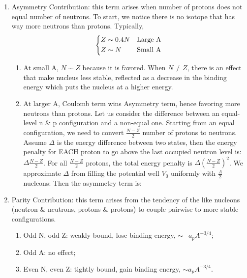 \documentclass{school-22.101-notes}
\begin{document}
\begin{enumerate}
    \item Asymmetry Contribution: this term arises when number of protons does not equal number of neutrons. To start, we notice there is no isotope that has way more neutrons than protons. Typically, 
    \begin{align}
    \begin{dcases*}
    Z \sim 0.4 N & Large A \\
    Z \sim N & Small A
    \end{dcases*}
    \end{align}
    \begin{enumerate}
    \item At small A, $N \sim Z$ because it is favored. When $N \neq Z$, there is an effect that make nucleus less stable, reflected as a decrease in the binding energy which puts the nucleus at a higher energy. 
    \item At larger A, Coulomb term wins Asymmetry term, hence favoring more neutrons than protons. Let us consider the difference between an equal-level n \& p configuration and a non-equal one. Starting from an equal configuration, we need to convert $\frac{N-Z}{2}$ number of protons to neutrons. Assume $\Delta$ is the energy difference between two states, then the energy penalty for EACH proton to go above the last occupied neutron level is: $\Delta \frac{N-Z}{2}$. For all $\frac{N-Z}{2}$ protons, the total energy penalty is $\Delta \left( \frac{N-Z}{2} \right)^2$. We approximate $\Delta$ from filling the potential well $V_0$ uniformly with $\frac{A}{2}$ nucleons: 
    Then the asymmetry term is:
    \end{enumerate}

    \item Parity Contribution: this term arises from the tendency of the like nucleons (neutron \& neutrons, protons \& protons) to couple pairwise to more stable configurations.
    \begin{enumerate}
    \item Odd N, odd Z: weakly bound, lose binding energy, $\sim -a_p A^{-3/4}$;
    \item Odd A: no effect;
    \item Even N, even Z: tightly bound, gain binding energy, $\sim a_p A^{-3/4}$.
    \end{enumerate}


\end{enumerate}
\end{document}
